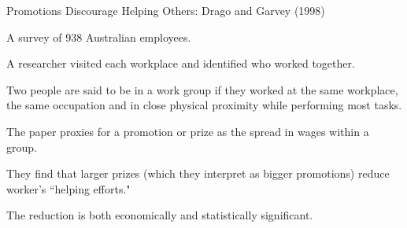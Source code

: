 \documentclass[aspectratio=169,usenames,dvipsnames]{beamer}
\newenvironment{wideitemize}{\itemize\addtolength{\itemsep}{10pt}}{\enditemize}
\begin{document}


\begin{frame}{Promotions Discourage Helping Others: Drago and Garvey (1998)}
\begin{wideitemize}
    \item A survey of 938 Australian employees.
    \item A researcher visited each workplace and identified who worked together.
    \item Two people are said to be in a work group if they worked at the same workplace, the same occupation and in close physical proximity while performing most tasks.
    \item The paper proxies for a promotion or prize as the spread in wages within a group.
    \item They find that larger prizes (which they interpret as bigger promotions) reduce worker's ``helping efforts."
    \item The reduction is both economically and statistically significant.
\end{wideitemize}
    
\end{frame}

\end{document}
